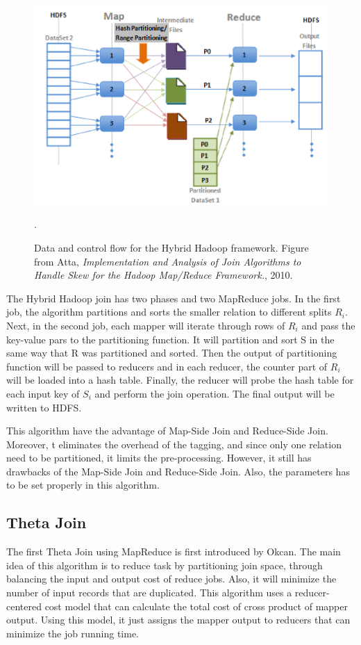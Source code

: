 \documentclass[sigconf, nonacm]{acmart}
\begin{document}
\begin{figure}[hbt!]
  \centering
  \includegraphics[width=\linewidth]{figures/9.png}
  \caption{Data and control flow for the Hybrid Hadoop framework.  Figure from Atta, \textit{Implementation and Analysis of Join Algorithms to Handle Skew for the Hadoop Map/Reduce Framework.}, 2010.}.
  \label{fig:9}
\end{figure}

The Hybrid Hadoop join has two phases and two MapReduce jobs. In the first job, the algorithm partitions and sorts the smaller relation to different splits $R_i$. Next, in the second job, each mapper will iterate through rows of $R_i$ and pass the key-value pars to the partitioning function. It will partition and sort S in the same way that R was partitioned and sorted. Then the output of partitioning function will be passed to reducers and in each reducer, the counter part of $R_i$ will be loaded into a hash table. Finally, the reducer will probe the hash table for each input key of $S_i$ and perform the join operation. The final output will be written to HDFS. 

This algorithm have the advantage of Map-Side Join and Reduce-Side Join. Moreover, t eliminates the overhead of the tagging, and since only one relation need to be partitioned, it limits the pre-processing. However, it still has drawbacks of the Map-Side Join and Reduce-Side Join. Also, the parameters has to be set properly in this algorithm.


\subsection{Theta Join}
The first Theta Join using MapReduce is first introduced by Okcan\cite{okcan2011processing}. The main idea of this algorithm is to reduce task by partitioning join space, through balancing the input and output cost of reduce jobs. Also, it will minimize the number of input records that are duplicated. This algorithm uses a reducer-centered cost model that can calculate the total cost of cross product of mapper output. Using this model, it just assigns the mapper output to reducers that can minimize the job running time. 
\end{document}
